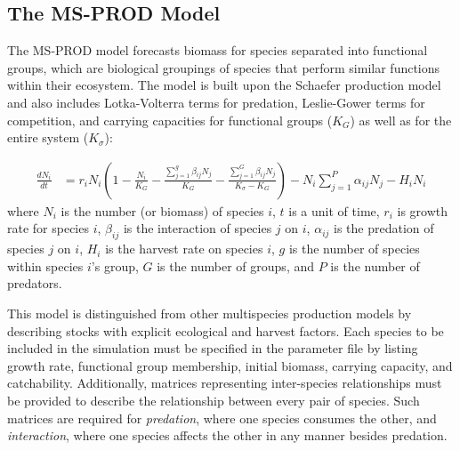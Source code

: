 \subsection{The MS-PROD Model}

The MS-PROD model forecasts biomass for species separated into functional groups, which are biological groupings of species that perform similar functions within their ecosystem.  The model is built upon the Schaefer production model and also includes Lotka-Volterra terms for predation, Leslie-Gower terms for competition, and carrying capacities for functional groups ($K_G$) as well as for the entire system ($K_{\sigma}$):

\begin{align}
\frac{d N_i}{dt} &= r_i N_i \left(1 - \frac{N_i}{K_G} - \frac{\displaystyle\sum\limits_{j=1}^g \beta_{ij} N_j}{K_G} - \frac{\displaystyle\sum\limits_{j=1}^G \beta_{ij} N_j}{K_{\sigma} - K_G}\right) - N_i \displaystyle\sum\limits_{j=1}^P \alpha_{ij} N_j - H_i N_i
\end{align}
where $N_i$ is the number (or biomass) of species $i$, $t$ is a unit of time, $r_i$ is growth rate for species $i$, $\beta_{ij}$ is the interaction of species $j$ on $i$, $\alpha_{ij}$ is the predation of species $j$ on $i$, $H_i$ is the harvest rate on species $i$, $g$ is the number of species within species $i$'s group, $G$ is the number of groups, and $P$ is the number of predators.

This model is distinguished from other multispecies production models by describing stocks with explicit ecological and harvest factors.  Each species to be included in the simulation must be specified in the parameter file by listing growth rate, functional group membership, initial biomass, carrying capacity, and catchability.  Additionally, matrices representing inter-species relationships must be provided to describe the relationship between every pair of species.  Such matrices are required for \textit{predation}, where one species consumes the other, and \textit{interaction}, where one species affects the other in any manner besides predation.

